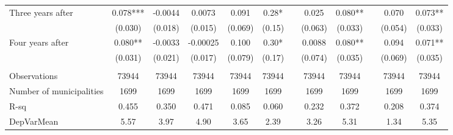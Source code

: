 \begin{tabular}{lccccccccccc}
Three years after & 0.078*** & -0.0044 & 0.0073 & 0.091 & 0.28* &       & 0.025 & 0.080** &       & 0.070 & 0.073** \\
      & (0.030) & (0.018) & (0.015) & (0.069) & (0.15) &       & (0.063) & (0.033) &       & (0.054) & (0.033) \\
Four years after & 0.080** & -0.0033 & -0.00025 & 0.100 & 0.30* &       & 0.0088 & 0.080** &       & 0.094 & 0.071** \\
      & (0.031) & (0.021) & (0.017) & (0.079) & (0.17) &       & (0.074) & (0.035) &       & (0.069) & (0.035) \\
      &       &       &       &       &       &       &       &       &       &       &  \\
\midrule
Observations & 73944 & 73944 & 73944 & 73944 & 73944 &       & 73944 & 73944 &       & 73944 & 73944 \\
Number of municipalities & 1699  & 1699  & 1699  & 1699  & 1699  &       & 1699  & 1699  &       & 1699  & 1699 \\
R-sq  & 0.455 & 0.350 & 0.471 & 0.085 & 0.060 &       & 0.232 & 0.372 &       & 0.208 & 0.374 \\
DepVarMean & 5.57  & 3.97  & 4.90  & 3.65  & 2.39  &       & 3.26  & 5.31  &       & 1.34  & 5.35 \\
\bottomrule
\bottomrule
\end{tabular}%
